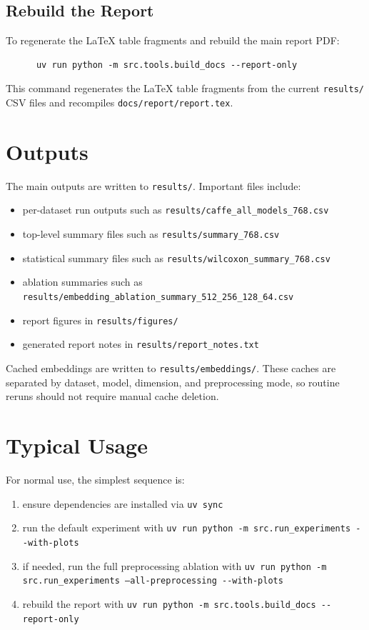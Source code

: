 \documentclass[10pt,a4paper]{article}
\begin{document}
\subsection{Rebuild the Report}
To regenerate the \LaTeX{} table fragments and rebuild the main report PDF:

\begin{verbatim}
      uv run python -m src.tools.build_docs --report-only
\end{verbatim}
This command regenerates the \LaTeX{} table fragments from the current
\texttt{results/} CSV files and recompiles \texttt{docs/report/report.tex}.


\section{Outputs}

The main outputs are written to \texttt{results/}. Important files include:
\begin{itemize}
\item per-dataset run outputs such as
      \texttt{results/caffe\_all\_models\_768.csv}
\item top-level summary files such as
      \texttt{results/summary\_768.csv}
\item statistical summary files such as
      \texttt{results/wilcoxon\_summary\_768.csv}
\item ablation summaries such as
      \texttt{results/embedding\_ablation\_summary\_512\_256\_128\_64.csv}
\item report figures in \texttt{results/figures/}
\item generated report notes in \texttt{results/report\_notes.txt}
\end{itemize}

Cached embeddings are written to \texttt{results/embeddings/}. These caches are separated by dataset, model, dimension, and preprocessing mode, so routine reruns should not require manual cache deletion.


\section{Typical Usage}

For normal use, the simplest sequence is:

\begin{enumerate}
      \item ensure dependencies are installed via \texttt{uv sync}
      \item run the default experiment with
            \texttt{uv run python -m src.run\_experiments -{}-with-plots}
      \item if needed, run the full preprocessing ablation with
            \texttt{uv run python -m src.run\_experiments --all-preprocessing -{}-with-plots}
      \item rebuild the report with
            \texttt{uv run python -m src.tools.build\_docs -{}-report-only}
\end{enumerate}
\end{document}

